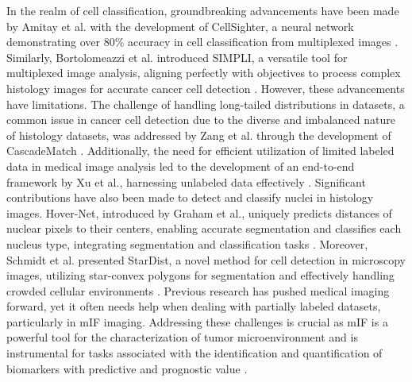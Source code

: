 \documentclass{midl} %
\begin{document}
In the realm of cell classification, groundbreaking advancements have been made by Amitay et al. with the development of CellSighter, a neural network demonstrating over 80\% accuracy in cell classification from multiplexed images \cite{amitay2023cellsighter}. Similarly, Bortolomeazzi et al. introduced SIMPLI, a versatile tool for multiplexed image analysis, aligning perfectly with objectives to process complex histology images for accurate cancer cell detection \cite{bortolomeazzi2022simpli}. However, these advancements have limitations. The challenge of handling long-tailed distributions in datasets, a common issue in cancer cell detection due to the diverse and imbalanced nature of histology datasets, was addressed by Zang et al. through the development of CascadeMatch \cite{zang2023semi}. Additionally, the need for efficient utilization of limited labeled data in medical image analysis led to the development of an end-to-end framework by Xu et al., harnessing unlabeled data effectively \cite{xu2021end}. Significant contributions have also been made to detect and classify nuclei in histology images. Hover-Net, introduced by Graham et al., uniquely predicts distances of nuclear pixels to their centers, enabling accurate segmentation and classifies each nucleus type, integrating segmentation and classification tasks \cite{graham2019hover}. Moreover, Schmidt et al. presented StarDist, a novel method for cell detection in microscopy images, utilizing star-convex polygons for segmentation and effectively handling crowded cellular environments \cite{schmidt2018cell}. Previous research has pushed medical imaging forward, yet it often needs help when dealing with partially labeled datasets, particularly in mIF imaging. Addressing these challenges is crucial as mIF is a powerful tool for the characterization of tumor microenvironment \cite{lee2020multiplex} and is instrumental for tasks associated with the identification and quantification of biomarkers with predictive and prognostic value \cite{rashid2019highly}.
\end{document}
